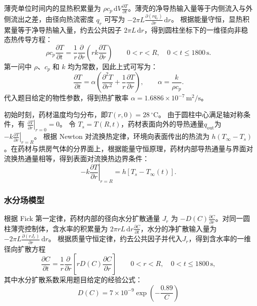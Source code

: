 \documentclass[withoutpreface,bwprint]{cumcmthesis}
\begin{document}
薄壳单位时间内的显热积累量为 $\rho c_p\,\mathrm{d}V\frac{\partial T}{\partial t}$。薄壳的净导热输入量等于内侧流入与外侧流出之差，由径向热流密度 $q_r$ 可写为 $-2\pi L\frac{\partial(rq_r)}{\partial r}\,\mathrm{d}r$。
根据能量守恒，显热积累量等于净导热输入量，约去公共因子 $2\pi L\,\mathrm{d}r$，得到圆柱坐标下的一维径向非稳态热传导方程：
\begin{equation}
\rho c_p\frac{\partial T}{\partial t}
=
\frac{1}{r}\frac{\partial}{\partial r}
\left(rk\frac{\partial T}{\partial r}\right)
\qquad 0<r<R,\quad 0<t\le1800\,\mathrm{s}.
\label{eq:q1-energy-conservation}
\end{equation}
第一问中 $\rho$、$c_p$ 和 $k$ 均为常数，因此上式可写为：
\begin{equation}
\frac{\partial T}{\partial t}
=\alpha\left(
\frac{\partial^2T}{\partial r^2}
+\frac{1}{r}\frac{\partial T}{\partial r}
\right),
\qquad
\alpha=\frac{k}{\rho c_p}.
\end{equation}
代入题目给定的物性参数，得到热扩散率 $\alpha=1.6886\times10^{-7}\,\mathrm{m^2/s}$。

初始时刻，药材温度均匀分布，即$T(r,0)=28\,{}^\circ\mathrm{C}$。
由于圆柱中心满足轴对称条件，有 $\left.\frac{\partial T}{\partial r}\right|_{r=0}=0$。
令 $T_s=T(R,t)$，药材表面向外的导热通量$q_{\mathrm{out}}$为 $-k\left.\frac{\partial T}{\partial r}\right|_{r=R}$。
根据 Newton 对流换热定律，环境向表面传出的热流为 $h(T_\infty-T_s)$。在药材与烘房气体的分界面上，根据能量守恒原理，药材内部导热通量与界面对流换热通量相等，得到表面对流换热边界条件：
\begin{equation}
-k\left.\frac{\partial T}{\partial r}\right|_{r=R}
=h\left[T_s-T_\infty(t)\right].
  \label{eq:q1-surface-heat-flux}
\end{equation}

\subsubsection{水分场模型}
根据 Fick 第一定律，药材内部的径向水分扩散通量 $J_r$ 为 $-D(C)\frac{\partial C}{\partial r}$。对同一圆柱薄壳控制体，含水率的积累量为 $2\pi rL\,\mathrm{d}r\frac{\partial C}{\partial t}$，水分的净扩散输入量为 $-2\pi L\frac{\partial(rJ_r)}{\partial r}\,\mathrm{d}r$。
根据质量守恒定律，约去公共因子并代入$J_r$，得到含水率的一维径向扩散方程
\begin{equation}
\frac{\partial C}{\partial t}
=
\frac{1}{r}\frac{\partial}{\partial r}
\left[rD(C)\frac{\partial C}{\partial r}\right]
\qquad 0<r<R,\quad 0<t\le1800\,\mathrm{s},
\label{eq:q1-mass-conservation}
\end{equation}
其中水分扩散系数采用题目给定的经验公式：
\begin{equation}
D(C)=7\times10^{-9}
\exp\left(-\frac{0.89}{C}\right)
\end{equation}
\end{document}
